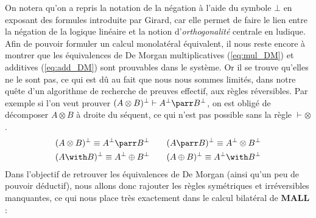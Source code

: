 \documentclass[11pt]{report}
\newcommand{\seq}{\vdash}
\newcommand{\irule}[1]{\footnotesize$#1$}
\newcommand{\iruleL}[1]{\irule{{#1}\seq}}
\newcommand{\iruleR}[1]{\irule{\seq{#1}}}
\begin{document}
On notera qu'on a repris la notation de la négation à l'aide du symbole $\bot$ en exposant des formules introduite par Girard, car elle permet de faire le lien entre la négation de la logique linéaire et la notion d'\emph{orthogonalité} centrale en ludique.\\

Afin de pouvoir formuler un calcul monolatéral équivalent, il nous reste encore à montrer que les équivalences de De Morgan multiplicatives (\ref{eq:mul_DM}) et additives (\ref{eq:add_DM}) sont prouvables dans le système. Or il se trouve qu'elles ne le sont pas, ce qui est dû au fait que nous nous sommes limités, dans notre quête d'un algorithme de recherche de preuves effectif, aux règles réversibles. Par exemple si l'on veut prouver $(A \otimes B)^\bot \seq A^\bot \parr B^\bot$, on est obligé de décomposer $A \otimes B$ à droite du séquent, ce qui n'est pas possible sans la règle {\iruleR{\otimes}}.
\begin{align}
    (A \otimes B)^\bot \equiv A^\bot \parr B^\bot &\qquad (A \parr B)^\bot \equiv A^\bot \otimes B^\bot \label{eq:mul_DM} \\
    (A \with B)^\bot \equiv A^\bot \oplus B^\bot &\qquad (A \oplus B)^\bot \equiv A^\bot \with B^\bot \label{eq:add_DM}
\end{align}
Dans l'objectif de retrouver les équivalences de De Morgan (ainsi qu'un peu de pouvoir déductif), nous allons donc rajouter les règles symétriques et irréversibles manquantes, ce qui nous place très exactement dans le calcul bilatéral de $\mathbf{MALL}$ :

\begin{center}
\end{center}
\end{document}

